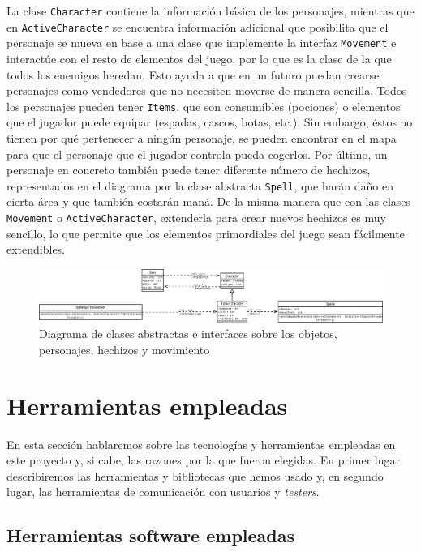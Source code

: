 La clase \texttt{Character} contiene la información básica de los personajes, mientras que en \texttt{ActiveCharacter} se encuentra información adicional que posibilita que el personaje se mueva en base a una clase que implemente la interfaz \texttt{Movement} e interactúe con el resto de elementos del juego, por lo que es la clase de la que todos los enemigos heredan. Esto ayuda a que en un futuro puedan crearse personajes como vendedores que no necesiten moverse de manera sencilla. 
Todos los personajes pueden tener \texttt{Items}, que son consumibles (pociones) o elementos que el jugador puede equipar (espadas, cascos, botas, etc.). Sin embargo, éstos no tienen por qué pertenecer a ningún personaje, se pueden encontrar en el mapa para que el personaje que el jugador controla pueda cogerlos.
Por último, un personaje en concreto también puede tener diferente número de hechizos, representados en el diagrama por la clase abstracta \texttt{Spell}, que harán daño en cierta área y que también costarán maná. De la misma manera que con las clases \texttt{Movement} o \texttt{ActiveCharacter}, extenderla para crear nuevos hechizos es muy sencillo, lo que permite que los elementos primordiales del juego sean fácilmente extendibles.

\begin{figure}
    \includegraphics[width=\textwidth,height=0.15\textwidth]{./img/charactersitems.png}
	\caption{Diagrama de clases abstractas e interfaces sobre los objetos, personajes, hechizos y movimiento}
	\label{fig:charactersitems}
\end{figure}

\section{Herramientas empleadas}

En esta sección hablaremos sobre las tecnologías y herramientas empleadas en este proyecto y, si cabe, las razones por la que fueron elegidas. En primer lugar describiremos las herramientas y bibliotecas que hemos usado y, en segundo lugar, las herramientas de comunicación con usuarios y \textit{testers}.

\subsection{Herramientas software empleadas}


